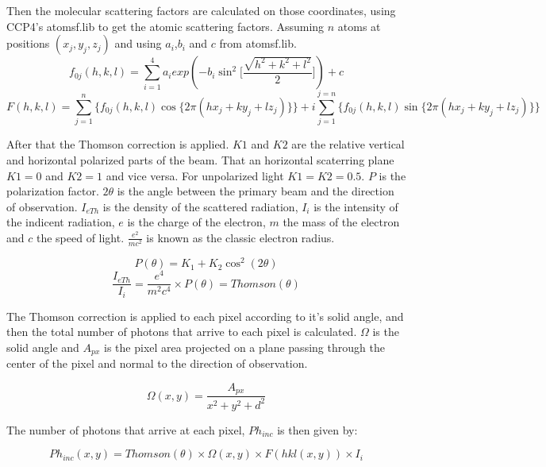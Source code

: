 \documentclass{report}
\begin{document}
Then the molecular scattering factors are calculated on those coordinates, using CCP4's atomsf.lib to get the atomic scattering factors.
Assuming $n$ atoms at positions $(x_j,y_j,z_j)$ and using $a_i$,$b_i$ and $c$ from atomsf.lib.
\begin{equation}
  f_{0j}(h,k,l) = \sum_{i=1}^{4} a_i exp(-b_i\sin^2\Biggl[\frac{\sqrt{h^2+k^2+l^2}}{2}\Biggl]) + c
\end{equation}
\begin{equation}
  F(h,k,l) = \sum_{j=1}^{n} \{f_{0j}(h,k,l) \cos\{2 \pi (h x_j+k y_j + l z_j)\}\} + i \sum_{j=1}^{j=n}\{f_{0j}(h,k,l) \sin\{2 \pi (h x_j+k y_j + l z_j)\}\}
\end{equation}

After that the Thomson correction is applied. $K1$ and $K2$ are the relative vertical and horizontal polarized parts of the beam.
That an horizontal scaterring plane $K1 = 0$ and $K2 = 1$ and vice versa. For unpolarized light $K1 = K2 = 0.5$.
$P$ is the polarization factor. $2\theta$ is the angle between the primary beam and the direction of observation.
$I_{eTh}$ is the density of the scattered radiation, $I_i$ is the intensity of the indicent radiation,
$e$ is the charge of the electron, $m$ the mass of the electron and $c$ the speed of light.
$\frac{e^2}{mc^2}$ is known as the classic electron radius.


\begin{equation}
   P(\theta) = K_1 +K_2 \cos^2(2\theta)
\end{equation}
\begin{equation}
   \frac{I_{eTh}}{I_i} = \frac{e^4}{m^2c^4} \times P(\theta) = Thomson(\theta)
\end{equation}

The Thomson correction is applied to each pixel according to it's solid angle, and then the total number of photons that arrive to each pixel is calculated.
$\Omega$ is the solid angle and $A_{px}$ is the pixel area projected on a plane passing through the center of the pixel and normal to the direction of observation.


\begin{equation}
   \Omega(x,y) = \frac{A_{px}}{x^2+y^2+d^2}
\end{equation}

The number of photons that arrive at each pixel, $Ph_{inc}$ is then given by:


\begin{equation}
   Ph_{inc}(x,y) = Thomson(\theta) \times \Omega(x,y) \times F(hkl(x,y)) \times I_i
\end{equation}
\end{document}

